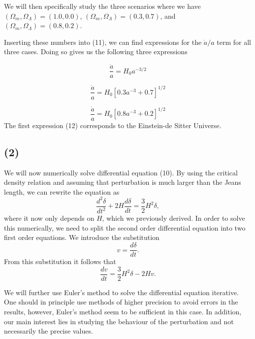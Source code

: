 \documentclass[a4paper]{article}
\begin{document}
We will then specifically study the three scenarios where we have  $(\Omega_m, \Omega_\Lambda) = (1.0, 0.0)$, $(\Omega_m, \Omega_\Lambda) = (0.3, 0.7)$, and $(\Omega_m, \Omega_\Lambda) = (0.8, 0.2)$. 

Inserting these numbers into (11), we can find expressions for the $\dot{a}/a$ term for all three cases. Doing so gives us the following three expressions

\begin{equation}
\frac{\dot{a}}{a} = H_0 a^{-3/2}
\end{equation}

\begin{equation}
\frac{\dot{a}}{a} = H_0 \left[0.3a^{-3} + 0.7\right]^{1/2}
\end{equation}

\begin{equation}
\frac{\dot{a}}{a} = H_0  \left[0.8a^{-3} + 0.2\right]^{1/2}
\end{equation}
The first expression (12) corresponds to the Einstein-de Sitter Universe.

\subsection*{(2)}

We will now numerically solve differential equation (10). By using the critical density relation and assuming that perturbation is much larger than the Jeans length, we can rewrite the equation as
\begin{equation}
    \frac{d^2 \delta}{dt^2} + 2H\frac{d \delta}{dt} = \frac{3}{2}H^2 \delta,
\end{equation}
where it now only depends on $H$, which we previously derived.
In order to solve this numerically, we need to split the second order differential equation into two first order equations. We introduce the substitution 
\begin{equation}
    v = \frac{d\delta}{d t}.
\end{equation}
From this substitution it follows that
\begin{equation}
    \frac{dv}{dt} = \frac{3}{2}H^2 \delta - 2Hv.
\end{equation}

We will further use Euler's method to solve the differential equation iterative. One should in principle use methods of higher precision to avoid errors in the results, however, Euler's method seem to be sufficient in this case. In addition, our main interest lies in studying the behaviour of the perturbation and not necessarily the precise values. 
\end{document}

